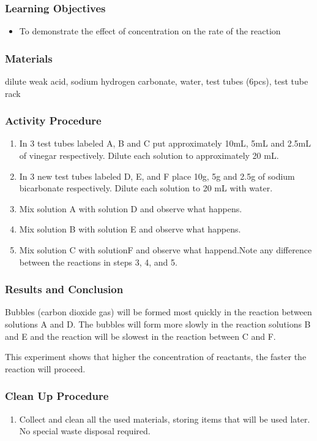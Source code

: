 \subsubsection*{Learning Objectives}
\begin{itemize}
\item{To demonstrate the effect of concentration on the rate of the reaction}
\end{itemize}

\subsubsection*{Materials}
dilute weak acid, sodium hydrogen carbonate, water, test tubes (6pcs), test tube rack

\subsubsection*{Activity Procedure}
\begin{enumerate}
\item{In 3 test tubes labeled A, B and C put approximately 10mL, 5mL and 2.5mL of vinegar respectively. Dilute each solution to approximately 20 mL.}
\item{In 3 new test tubes labeled D, E, and F place 10g, 5g and 2.5g of sodium bicarbonate respectively. Dilute each solution to 20 mL with water.}
\item{Mix solution A with solution D and observe what happens.}
\item{Mix solution B with solution E and observe what happens.}
\item{Mix solution C with solutionF and observe what happend.Note any difference between the reactions in steps 3, 4, and 5.}
\end{enumerate}

\subsubsection*{Results and Conclusion}
Bubbles (carbon dioxide gas) will be formed most quickly in the reaction between solutions A and D. The bubbles will form more slowly in the reaction solutions B and E and the reaction will be slowest in the reaction between C and F. 

This experiment shows that higher the concentration of reactants, the faster the reaction will proceed.

\subsubsection*{Clean Up Procedure}
\begin{enumerate}
\item{Collect and clean all the used materials, storing items that will be used later. No special waste disposal required.}
\end{enumerate}

